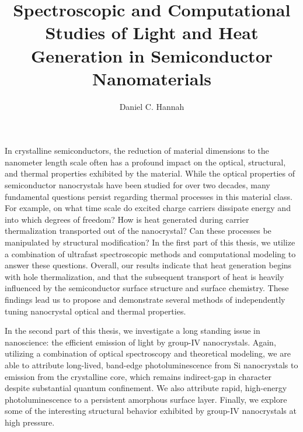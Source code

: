 \documentclass[12pt]{nuthesis}	%
\author{Daniel C. Hannah}
\title{Spectroscopic and Computational Studies of Light and Heat Generation in Semiconductor Nanomaterials}
\begin{document}
%	
%


\frontmatter		%

\maketitle		%

\copyrightpage		%


\abstract		%

In crystalline semiconductors, the reduction of material dimensions to the nanometer length scale often has a profound impact on the optical, structural, and thermal properties exhibited by the material. While the optical properties of semiconductor nanocrystals have been studied for over two decades, many fundamental questions persist regarding thermal processes in this material class. For example, on what time scale do excited charge carriers dissipate energy and into which degrees of freedom? How is heat generated during carrier thermalization transported out of the nanocrystal? Can these processes be manipulated by structural modification? In the first part of this thesis, we utilize a combination of ultrafast spectroscopic methods and computational modeling to answer these questions. Overall, our results indicate that heat generation begins with hole thermalization, and that the subsequent transport of heat is heavily influenced by the semiconductor surface structure and surface chemistry. These findings lead us to propose and demonstrate several methods of independently tuning nanocrystal optical and thermal properties. \par
In the second part of this thesis, we investigate a long standing issue in nanoscience: the efficient emission of light by group-IV nanocrystals. Again, utilizing a combination of optical spectroscopy and theoretical modeling, we are able to attribute long-lived, band-edge photoluminescence from Si nanocrystals to emission from the crystalline core, which remains indirect-gap in character despite substantial quantum confinement. We also attribute rapid, high-energy photoluminescence to a persistent amorphous surface layer. Finally, we explore some of the interesting structural behavior exhibited by group-IV nanocrystals at high pressure.

\acknowledgements	%
\end{document}
